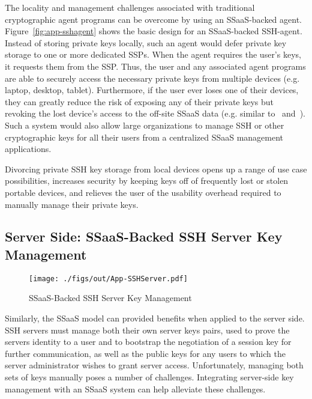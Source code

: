 The locality and management challenges associated with traditional
cryptographic agent programs can be overcome by using an SSaaS-backed
agent. Figure~\ref{fig:app-sshagent} shows the basic design for an
SSaaS-backed SSH-agent. Instead of storing private keys locally, such
an agent would defer private key storage to one or more dedicated
SSPs. When the agent requires the user's keys, it requests them from
the SSP. Thus, the user and any associated agent programs are able to
securely access the necessary private keys from multiple devices
(e.g. laptop, desktop, tablet). Furthermore, if the user ever loses
one of their devices, they can greatly reduce the risk of exposing any
of their private keys but revoking the lost device's access to the
off-site SSaaS data (e.g. similar to~\cite{geambasu2011}
and~\cite{tang2012}). Such a system would also allow large
organizations to manage SSH or other cryptographic keys for all their
users from a centralized SSaaS management applications.

Divorcing private SSH key storage from local devices opens up a range
of use case possibilities, increases security by keeping keys off of
frequently lost or stolen portable devices, and relieves the user of
the usability overhead required to manually manage their private keys.

\subsection{Server Side: SSaaS-Backed SSH Server Key Management}

\begin{figure}[t]
  \centering
  \texttt{[image: ./figs/out/App-SSHServer.pdf]}
  \caption{SSaaS-Backed SSH Server Key Management}
  \label{fig:apps-sshserver}
\end{figure}

Similarly, the SSaaS model can provided benefits when applied to the
server side. SSH servers must manage both their own server keys pairs,
used to prove the servers identity to a user and to bootstrap the
negotiation of a session key for further communication, as well as the
public keys for any users to which the server administrator wishes to
grant server access. Unfortunately, managing both sets of keys
manually poses a number of challenges. Integrating server-side key
management with an SSaaS system can help alleviate these challenges.

